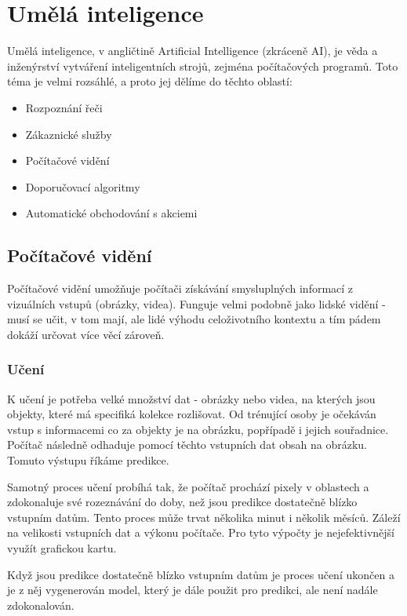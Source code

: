 \section{Umělá inteligence}
Umělá inteligence, v angličtině Artificial Intelligence (zkráceně AI), je věda a inženýrství vytváření inteligentních strojů, zejména počítačových programů.\cite{What-is-AI} Toto téma je velmi rozsáhlé, a proto jej dělíme do těchto oblastí\cite{IBM-AI}:
\begin{itemize}
	\item Rozpoznání řeči
	\item Zákaznické služby
	\item Počítačové vidění
	\item Doporučovací algoritmy
	\item Automatické obchodování s akciemi
\end{itemize}

\subsection{Počítačové vidění}
Počítačové vidění umožňuje počítači získávání smysluplných informací z vizuálních vstupů (obrázky, videa). \cite{IBM-CV} Funguje velmi podobně jako lidské vidění - musí se učit, v tom mají, ale lidé výhodu celoživotního kontextu a tím pádem dokáží určovat více věcí zároveň.\par

\subsubsection{Učení}
K učení je potřeba velké množství dat - obrázky nebo videa, na kterých jsou objekty, které má specifiká kolekce rozlišovat. Od trénující osoby je očekáván vstup s informacemi co za objekty je na obrázku, popřípadě i jejich souřadnice. Počítač následně odhaduje pomocí těchto vstupních dat obsah na obrázku. Tomuto výstupu říkáme predikce.\par
Samotný proces učení probíhá tak, že počítač prochází pixely v oblastech a zdokonaluje své rozeznávání do doby, než jsou predikce dostatečně blízko vstupním datům. Tento proces může trvat několika minut i několik měsíců. Záleží na velikosti vstupních dat a výkonu počítače. Pro tyto výpočty je nejefektivnější využít grafickou kartu.\par
Když jsou predikce dostatečně blízko vstupním datům je proces učení ukončen a je z něj vygenerován model, který je dále použit pro predikci, ale není nadále zdokonalován. 

